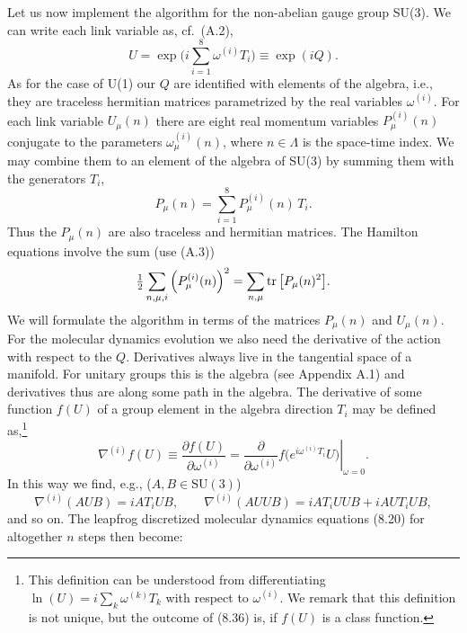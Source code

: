 Let us now implement the algorithm for the non-abelian gauge group SU(3). We
can write each link variable as, cf.\ (A.2),
\begin{equation}
U = \exp\Big(i\sum_{i=1}^{8}\omega^{(i)}T_i\Big) \equiv \exp(iQ).
\end{equation}
As for the case of U(1) our $Q$ are identified with elements of the algebra,
i.e., they are traceless hermitian matrices parametrized by the real variables
$\omega^{(i)}$. For each link variable $U_\mu(n)$ there are eight real momentum
variables $P_\mu^{(i)}(n)$ conjugate to the parameters $\omega_\mu^{(i)}(n)$,
where $n \in \Lambda$ is the space-time index. We may combine them to an
element of the algebra of SU(3) by summing them with the generators $T_i$,
\begin{equation}
P_\mu(n) = \sum_{i=1}^{8}P_\mu^{(i)}(n)\,T_i.
\end{equation}
Thus the $P_\mu(n)$ are also traceless and hermitian matrices. The Hamilton
equations involve the sum (use (A.3))
\begin{equation}
\tfrac{1}{2}\sum_{n,\mu,i}\Big(P_\mu^{(i)}(n)\Big)^2 = \sum_{n,\mu}\operatorname{tr}\big[P_\mu(n)^2\big].
\end{equation}
We will formulate the algorithm in terms of the matrices $P_\mu(n)$ and
$U_\mu(n)$.
For the molecular dynamics evolution we also need the derivative of the action
with respect to the $Q$. Derivatives always live in the tangential space of a
manifold. For unitary groups this is the algebra (see Appendix A.1) and
derivatives thus are along some path in the algebra. The derivative of some
function $f(U)$ of a group element in the algebra direction $T_i$ may be
defined as,\footnote{This definition can be understood from differentiating
$\ln(U) = i\sum_k \omega^{(k)}T_k$ with respect to $\omega^{(i)}$. We remark
that this definition is not unique, but the outcome of (8.36) is, if $f(U)$ is
a class function.}
\begin{equation}
\nabla^{(i)}f(U) \equiv \frac{\partial f(U)}{\partial\omega^{(i)}}
= \left.\frac{\partial}{\partial\omega^{(i)}}f\big(e^{i\omega^{(i)}T_i}U\big)\right|_{\omega=0}.
\end{equation}
In this way we find, e.g., ($A, B \in \mathrm{SU}(3)$)
\begin{equation}
\nabla^{(i)}(AUB) = iAT_iUB, \qquad
\nabla^{(i)}(AUUB) = iAT_iUUB + iAUT_iUB,
\end{equation}
and so on. The leapfrog discretized molecular dynamics equations (8.20) for
altogether $n$ steps then become:
